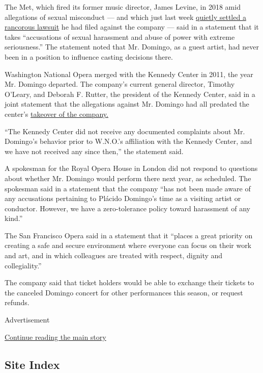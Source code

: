 The Met, which fired its former music director, James Levine, in 2018
amid allegations of sexual misconduct --- and which just last week
\href{https://www.nytimes3xbfgragh.onion/2019/08/06/arts/music/james-levine-metropolitan-opera.html}{quietly
settled a rancorous lawsuit} he had filed against the company --- said
in a statement that it takes ``accusations of sexual harassment and
abuse of power with extreme seriousness.'' The statement noted that Mr.
Domingo, as a guest artist, had never been in a position to influence
casting decisions there.

Washington National Opera merged with the Kennedy Center in 2011, the
year Mr. Domingo departed. The company's current general director,
Timothy O'Leary, and Deborah F. Rutter, the president of the Kennedy
Center, said in a joint statement that the allegations against Mr.
Domingo had all predated the center's
\href{http://www.washingtonpost.com/wp-dyn/content/article/2011/01/20/AR2011012001924.html}{takeover
of the company.}

``The Kennedy Center did not receive any documented complaints about Mr.
Domingo's behavior prior to W.N.O.'s affiliation with the Kennedy
Center, and we have not received any since then,'' the statement said.

A spokesman for the Royal Opera House in London did not respond to
questions about whether Mr. Domingo would perform there next year, as
scheduled. The spokesman said in a statement that the company ``has not
been made aware of any accusations pertaining to Plácido Domingo's time
as a visiting artist or conductor. However, we have a zero-tolerance
policy toward harassment of any kind.''

The San Francisco Opera said in a statement that it ``places a great
priority on creating a safe and secure environment where everyone can
focus on their work and art, and in which colleagues are treated with
respect, dignity and collegiality.''

The company said that ticket holders would be able to exchange their
tickets to the canceled Domingo concert for other performances this
season, or request refunds.

Advertisement

\protect\hyperlink{after-bottom}{Continue reading the main story}

\hypertarget{site-index}{%
\subsection{Site Index}\label{site-index}}

